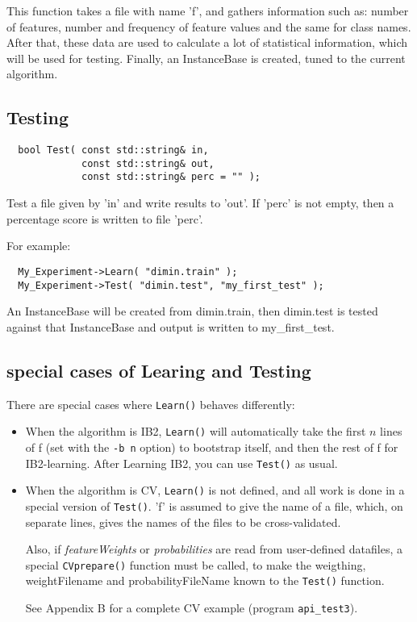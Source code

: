 \documentclass{report}
\begin{document}
This function takes a file with name 'f', and gathers information
such as: number of features, number and frequency of feature values and
the same for class names. After that, these data are used to calculate
a lot of statistical information, which will be used for
testing. Finally, an InstanceBase is created, tuned to the current
algorithm.

\subsection{Testing}
\begin{footnotesize}
\begin{verbatim}
  bool Test( const std::string& in,
             const std::string& out,
             const std::string& perc = "" );
\end{verbatim}
\end{footnotesize}

Test a file given by 'in' and write results to 'out'. If 'perc' is not
empty, then a percentage score is written to file 'perc'.

For example:

\begin{footnotesize}
\begin{verbatim}
  My_Experiment->Learn( "dimin.train" );  
  My_Experiment->Test( "dimin.test", "my_first_test" );  
\end{verbatim}
\end{footnotesize}

An InstanceBase will be created from dimin.train, then dimin.test is
tested against that InstanceBase and output is written to
my\_first\_test.

\subsection{special cases of Learing and Testing}

There are special cases where {\tt Learn()} behaves differently:

\begin{itemize}
\item When the algorithm is IB2, {\tt Learn()} will automatically take
  the first $n$ lines of f (set with the {\tt -b n} option) to
  bootstrap itself, and then the rest of f for IB2-learning. After
  Learning IB2, you can use {\tt Test()} as usual.

\item When the algorithm is CV, {\tt Learn()} is not defined, and all
  work is done in a special version of {\tt Test()}. 'f' is assumed to
  give the name of a file, which, on separate lines, gives the names
  of the files to be cross-validated.

  Also, if {\em featureWeights}\/ or {\em probabilities}\/ are read from 
  user-defined datafiles, a special {\tt CVprepare()} function must be called, 
  to make the weigthing, weightFilename and probabilityFileName known to the 
{\tt Test()} function.

See Appendix B for a complete CV example (program {\tt api\_test3}).


\end{itemize}
\end{document}
